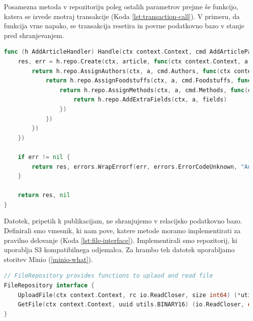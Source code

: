 \documentclass[a4paper, 12pt]{book}
\begin{document}
Posamezna metoda v repozitoriju poleg ostalih parametrov prejme še funkcijo, katera se izvede znotraj transakcije (Koda \ref{lst:transaction-call}). V primeru, da funkcija vrne napako, se transakcija resetira in povrne podatkovno bazo v stanje pred shranjevanjem.

\begin{lstlisting}[language=go,style=mystyle,caption={ Prikaz shranjevanja publikacije },label=lst:transaction-call]
func (h AddArticleHandler) Handle(ctx context.Context, cmd AddArticleParamsCmd) (res *domain.Article, err error) {
	res, err = h.repo.Create(ctx, article, func(ctx context.Context, a *domain.Article) error {
		return h.repo.AssignAuthors(ctx, a, cmd.Authors, func(ctx context.Context, a *domain.Article) error {
			return h.repo.AssignFoodstuffs(ctx, a, cmd.Foodstuffs, func(ctx context.Context, a *domain.Article) error {
				return h.repo.AssignMethods(ctx, a, cmd.Methods, func(ctx context.Context, a *domain.Article) error {
					return h.repo.AddExtraFields(ctx, a, fields)
				})
			})
		})
	})
	
	if err != nil {
		return res, errors.WrapErrorf(err, errors.ErrorCodeUnknown, "AddArticleHandler.repo")
	}
	
	return res, nil
}
\end{lstlisting}

Datotek, pripetih k publikacijam, ne shranjujemo v relacijsko podatkovno bazo. Definirali smo vmesnik, ki nam pove, katere metode moramo implementirati za pravilno delovanje (Koda \ref{lst:file-interface}). Implementirali smo repozitorij, ki uporablja S3 kompatibilnega odjemalca. Za hrambo teh datotek uporabljamo storitev Minio (\ref{minio-what}).

\begin{lstlisting}[language=go,style=mystyle,caption={Prikaz vmesnika za shranjevanje in branje datotek},label=lst:file-interface]
// FileRepository provides functions to uplaod and read file
FileRepository interface {
	UploadFile(ctx context.Context, rc io.ReadCloser, size int64) (*utils.BINARY16, error)
	GetFile(ctx context.Context, uuid utils.BINARY16) (io.ReadCloser, error)
}
\end{lstlisting}
\end{document}
